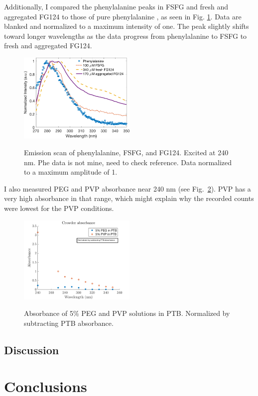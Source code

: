 Additionally, I compared the phenylalanine peaks in FSFG and fresh and aggregated FG124 to those of pure phenylalanine \cite{zotero-5177}, as seen in Fig. \ref{fig:phe-comparison}.  Data are blanked and normalized to a maximum intensity of one.  The peak slightly shifts toward longer wavelengths as the data progress from phenylalanine to FSFG to fresh and aggregated FG124.
\begin{figure}
\caption{Emission scan of phenylalanine, FSFG, and FG124. Excited at 240 nm.  Phe data is not mine, need to check reference. Data normalized to a maximum amplitude of 1.}
\centering
\includegraphics[width=0.5\textwidth]{figs/ch05/phe-comparison}
\label{fig:phe-comparison}
\end{figure}
I also measured PEG and PVP absorbance near 240 nm (see Fig.~\ref{fig:crowder-absorbance}).  PVP has a very high absorbance in that range, which might explain why the recorded counts were lowest for the PVP conditions.
\begin{figure}
\caption{Absorbance of 5\% PEG and PVP solutions in PTB.  Normalized by subtracting PTB absorbance.}
\centering
\includegraphics[width=0.5\textwidth]{figs/ch05/crowder-absorbance}
\label{fig:crowder-absorbance}
\end{figure}
\subsection{Discussion}

\section{Conclusions}


